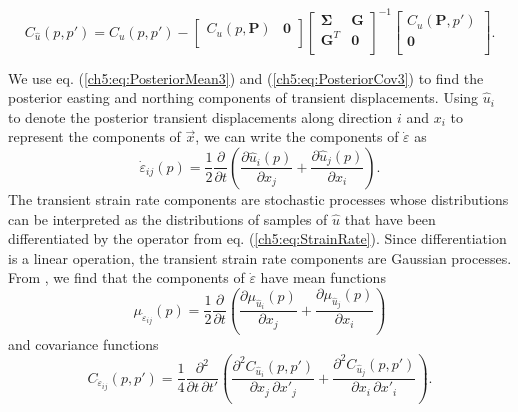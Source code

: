 \begin{equation}\label{ch5:eq:PosteriorCov3}
C_{\hat{u}}(p,p') = C_u(p,p') - 
                    \left[\begin{array}{cc}
                          C_u(p,\mathbf{P}) & \mathbf{0} \\
                          \end{array}\right]
                    \left[\begin{array}{cc}
                          \mathbf{\Sigma} & \mathbf{G} \\
                          \mathbf{G}^T  & \mathbf{0} \\
                          \end{array}\right]^{-1}
                    \left[\begin{array}{c}
                          C_u(\mathbf{P},p') \\
                          \mathbf{0} \\
                          \end{array}\right].
\end{equation}

We use eq. (\ref{ch5:eq:PosteriorMean3}) and (\ref{ch5:eq:PosteriorCov3}) to find the posterior easting and northing components of transient displacements. Using $\hat{u}_i$ to denote the posterior transient displacements along direction $i$ and $x_i$ to represent the components of $\vec{x}$, we can write the components of $\dot\varepsilon$ as 
\begin{equation}\label{ch5:eq:StrainRate}
\dot\varepsilon_{ij}(p) = \frac{1}{2} \frac{\partial}{\partial t} \left(
                                        \frac{\partial \hat{u}_i(p)}{\partial x_j} +  
                                        \frac{\partial \hat{u}_j(p)}{\partial x_i}\right).
\end{equation}
The transient strain rate components are stochastic processes whose distributions can be interpreted as the distributions of samples of $\hat{u}$ that have been differentiated by the operator from eq. (\ref{ch5:eq:StrainRate}). Since differentiation is a linear operation, the transient strain rate components are Gaussian processes. From \citet[sec. 10.2]{Papoulis1991}, we find that the components of $\dot{\varepsilon}$ have mean functions
\begin{equation}\label{ch5:eq:StrainMean}
\mu_{\dot\varepsilon_{ij}}(p) = \frac{1}{2}\frac{\partial}{\partial t}\left(
                                  \frac{\partial \mu_{\hat{u}_i}(p)}{\partial x_j} + 
                                  \frac{\partial \mu_{\hat{u}_j}(p)}{\partial x_i} \right)
\end{equation} 
and covariance functions
\begin{equation}\label{ch5:eq:StrainCov}
C_{\dot\varepsilon_{ij}}(p,p') = \frac{1}{4} \frac{\partial^2}{\partial t \, \partial t'}\left(
                                   \frac{\partial^2 C_{\hat{u}_i}(p,p')}{\partial x_j \, \partial x'_j} + 
                                   \frac{\partial^2 C_{\hat{u}_j}(p,p')}{\partial x_i \, \partial x'_i} \right).
\end{equation} 

